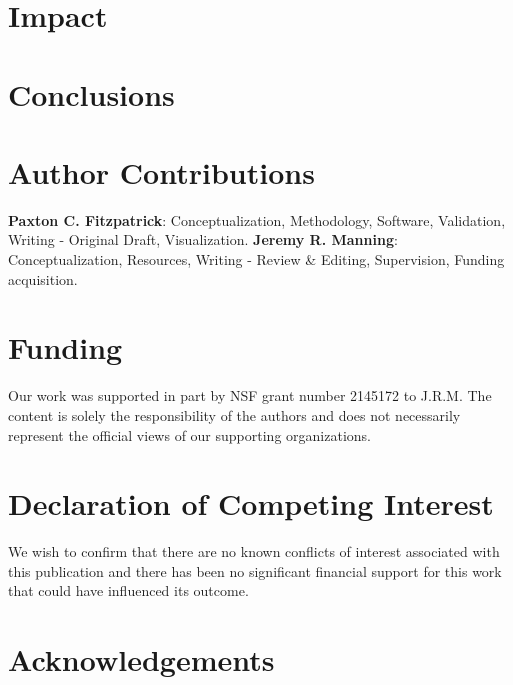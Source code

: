 \documentclass[preprint,12pt, a4paper]{elsarticle}
\begin{document}
\section{Impact}








\section{Conclusions}


\section*{Author Contributions}
\textbf{Paxton C. Fitzpatrick}: Conceptualization, Methodology, Software, Validation, Writing - Original Draft, Visualization. \textbf{Jeremy R. Manning}: Conceptualization, Resources, Writing - Review \& Editing, Supervision, Funding acquisition.

\section*{Funding}
Our work was supported in part by NSF grant number 2145172 to J.R.M. 
The content is solely the responsibility of the authors and does not necessarily represent the official views of our supporting organizations.


\section*{Declaration of Competing Interest}
We wish to confirm that there are no known conflicts of interest associated with this publication and there has been no significant financial support for this work that could have influenced its outcome.


\section*{Acknowledgements}


 

\end{document}
